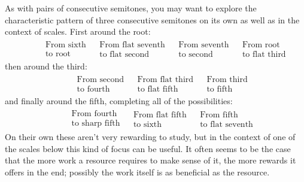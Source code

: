 \documentclass[english]{./gbook}
\begin{document}
\begin{large}
As with pairs of consecutive semitones, you may want to explore the characteristic pattern of three consecutive semitones on its own as well as in the context of scales. First around the root:
\[
\begin{array}{cccc}
	&%
	&%
	&%
	\begin{array}{c}\text{From sixth}\\ \text{to root}\end{array} & 
	\begin{array}{c}\text{From flat seventh} \\ \text{to flat second}\end{array} & 
	\begin{array}{c}\text{From seventh} \\ \text{to second}\end{array} &
	\begin{array}{c}\text{From root} \\ \text{to flat third}\end{array} 
\end{array}
\]
then around the third:
\[
\begin{array}{ccc}
	&%
	&%
	\begin{array}{c}\text{From second}\\ \text{to fourth}\end{array} & 
	\begin{array}{c}\text{From flat third} \\ \text{to flat fifth}\end{array} & 
	\begin{array}{c}\text{From third} \\ \text{to fifth}\end{array} 
\end{array}
\]
and finally around the fifth, completing all of the possibilities:
\[
\begin{array}{ccc}
	&%
	&%
	\begin{array}{c}\text{From fourth}\\ \text{to sharp fifth}\end{array} & 
	\begin{array}{c}\text{From flat fifth} \\ \text{to sixth}\end{array} & 
	\begin{array}{c}\text{From fifth} \\ \text{to flat seventh}\end{array} 
\end{array}
\]
On their own these aren't very rewarding to study, but in the context of one of the scales below this kind of focus can be useful. It often seems to be the case that the more work a resource requires to make sense of it, the more rewards it offers in the end; possibly the work itself is as beneficial as the resource.


\end{large}
\end{document}
